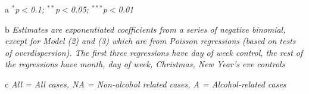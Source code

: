 \documentclass[12pt, a4paper]{article}
\begin{document}
\begin{table}
{\begin{threeparttable}
\begin{tablenotes}
      \item[a] \textit{$^{*}$p$<$0.1; $^{**}$p$<$0.05; $^{***}$p$<$0.01}
      \item[b] \textit{Estimates are exponentiated coefficients from a series of negative binomial, except for Model (2) and (3) which are from Poisson regressions (based on tests of overdispersion). The first three regressions have day of week control, the rest of the regressions have month, day of week, Christmas, New Year's eve controls}
      \item[c] \textit{All = All cases, NA = Non-alcohol related cases, A = Alcohol-related cases}
    \end{tablenotes}
\end{threeparttable} }
\end{table}


\newpage
\end{document}
